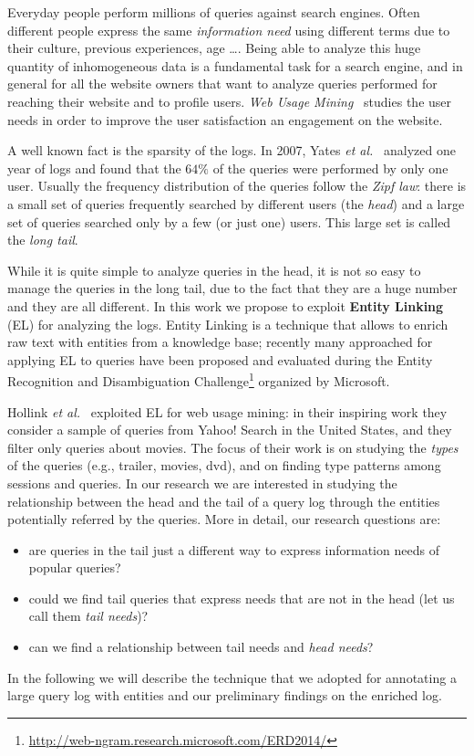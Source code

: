 
Everyday people perform millions of queries against search engines. Often different people express
the same \emph{information need} using different terms due to their culture, previous experiences,
age \dots. Being able to analyze this huge quantity of inhomogeneous data is a fundamental 
task for a search engine, and in general for all the website owners that want to analyze queries 
performed for reaching their website and to profile users. \emph{Web Usage Mining}~\cite{silvestri2010mining}  
studies the user needs in order to improve the user satisfaction an engagement on the website. 

A well known fact is the sparsity of the logs. In 2007, Yates \emph{ et al.}~\cite{baeza2007impact} 
analyzed one year of logs and found that the $64\%$ of the queries were performed by only one user.
Usually the frequency distribution of the queries follow the \emph{Zipf law}: there is a small 
set of queries frequently searched by different users (the \emph{head}) and a large set of queries
searched only by a few (or just one) users. This large set is called the \emph{long tail}.

While it is quite simple to analyze queries in the head, it is not so easy to manage the queries in the long tail, 
due to the fact that they are a huge number and they are all different. In this work we propose
to exploit \textbf{Entity Linking} (EL) for analyzing the logs. Entity Linking is a technique 
that allows to enrich raw text with entities from a knowledge base; recently many approached for applying 
EL to queries have been proposed and evaluated during the Entity Recognition and Disambiguation Challenge\footnote{
\url{http://web-ngram.research.microsoft.com/ERD2014/}} organized by Microsoft. 

Hollink \emph{et al.}~\cite{hollink2013web} exploited EL for web usage mining: in their inspiring work they consider a sample of 
queries from Yahoo! Search in the United States, and they filter only queries about movies. The focus
of their work is on studying the \emph{types} of the queries (e.g., trailer, movies, dvd), and on finding
type patterns among sessions and queries. In our research we are interested in studying the 
relationship between the head and the tail of a query log
through the entities potentially referred by the queries. More in detail, our research questions are:
\begin{itemize}
	\item are queries in the tail just a different way to express information needs of popular queries? 
	\item could we find tail queries that express needs that are not in the head (let us call them \emph{tail needs})?
	\item can we find a relationship between tail needs and \emph{head needs}?  
\end{itemize} 

In the following we will describe the technique that we adopted for annotating a large query log with entities 
and our preliminary findings on the enriched log.


 
